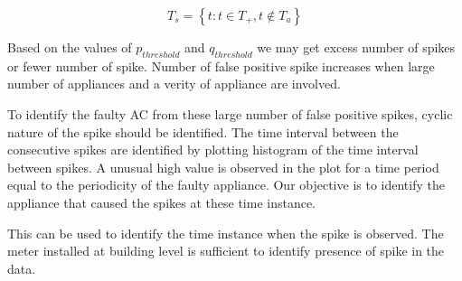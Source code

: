 $$ T_s = \left \{ t :  t \in T_+,  t \notin T_a \right \} $$  

Based on the values of $p_{threshold}$ and $q_{threshold}$ we may get excess number of spikes or fewer number of spike. Number of false positive spike increases when large number of appliances and a verity of appliance are involved. 

To identify the faulty AC from these large number of false positive spikes, cyclic nature of the spike should be identified. The time interval between the consecutive spikes are identified by plotting histogram of the time interval between spikes. A unusual high value is observed in the plot for a time period equal to the periodicity of the faulty appliance. Our objective is to identify the appliance that caused the spikes at these time instance.

This can be used to identify the time instance when the spike is observed. The meter installed at building level is sufficient to identify presence of spike in the data. 
